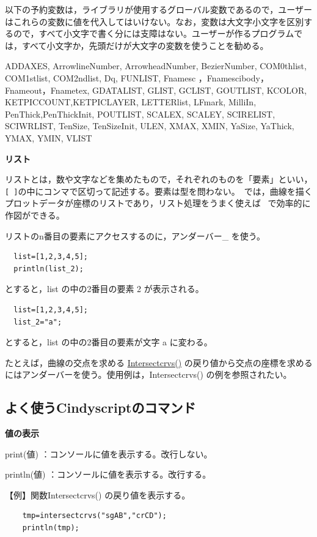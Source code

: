 \documentclass[papersize,a4paper,12pt,uplatex]{jsarticle}
\begin{document}
以下の予約変数は，ライブラリが使用するグローバル変数であるので，ユーザーはこれらの変数に値を代入してはいけない。なお，変数は大文字小文字を区別するので，すべて小文字で書く分には支障はない。ユーザーが作るプログラムでは，すべて小文字か，先頭だけが大文字の変数を使うことを勧める。

\vspace{\baselineskip}
ADDAXES, ArrowlineNumber, ArrowheadNumber, BezierNumber, COM0thlist, COM1stlist, COM2ndlist, Dq, FUNLIST, Fnamesc ，Fnamescibody，Fnameout，Fnametex, GDATALIST, GLIST, GCLIST, GOUTLIST, KCOLOR, KETPICCOUNT,KETPICLAYER, LETTERlist, LFmark, MilliIn, PenThick,PenThickInit,  POUTLIST, SCALEX, SCALEY, SCIRELIST, SCIWRLIST, TenSize, TenSizeInit, ULEN, XMAX, XMIN, YaSize, YaThick,   YMAX, YMIN, VLIST


\vspace{\baselineskip}\noindent
{\bf  リスト}

リストとは，数や文字などを集めたもので，それぞれのものを「要素」といい，\verb|[ ]|の中にコンマで区切って記述する。要素は型を問わない。\ketcindy\ では，曲線を描くプロットデータが座標のリストであり，リスト処理をうまく使えば \ketcindy\ で効率的に作図ができる。

リストのn番目の要素にアクセスするのに，アンダーバー\_ を使う。

\begin{verbatim}
  list=[1,2,3,4,5];
  println(list_2);
\end{verbatim}
とすると，list の中の2番目の要素 2 が表示される。
\begin{verbatim}
  list=[1,2,3,4,5];
  list_2="a";
\end{verbatim}
とすると，list の中の2番目の要素が文字 a に変わる。

たとえば，曲線の交点を求める \hyperlink{intersectcrvs}{Intersectcrvs()} の戻り値から交点の座標を求めるにはアンダーバーを使う。使用例は，Intersectcrvs() の例を参照されたい。

\subsection{よく使うCindyscriptのコマンド}
\vspace{\baselineskip}\noindent
{\bf 値の表示}

print(値)   ：コンソールに値を表示する。改行しない。

println(値) ：コンソールに値を表示する。改行する。

\vspace{\baselineskip}
【例】関数Intersectcrvs() の戻り値を表示する。
\begin{verbatim}
    tmp=intersectcrvs("sgAB","crCD");
    println(tmp);
\end{verbatim}
\end{document}
